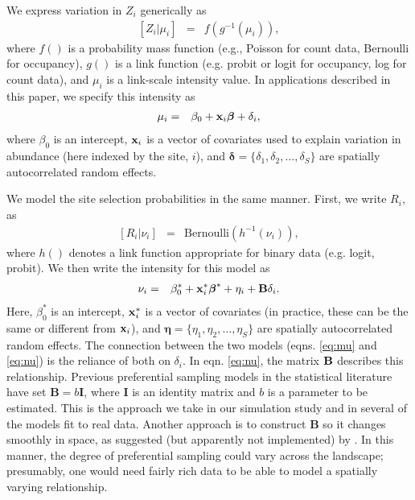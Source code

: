 \documentclass[times,mee,doublespace,]{besauth2}
\begin{document}
\begin{flushleft}
\hspace{0.5in} We express variation in $Z_i$ generically as
\begin{eqnarray}
  \label{eq:process}
  [Z_i|\mu_i] & = & f(g^{-1}(\mu_i)),
\end{eqnarray}
where $f()$ is a probability mass function (e.g., Poisson for count data, Bernoulli for occupancy), $g()$ is a link function (e.g. probit or logit for occupancy, log for count data), and $\mu_i$ is a link-scale intensity value.  In applications described in this paper, we specify this intensity as
\begin{eqnarray}
\mu_i & = & \beta_0 + {\bf x}_i \boldsymbol{\beta}+\delta_i,
 \label{eq:mu}
\end{eqnarray}
where $\beta_0$ is an intercept, ${\bf x}_i$ is a vector of covariates used to explain variation in abundance (here indexed by the site, $i$), and $\boldsymbol{\delta}=\{ \delta_1,\delta_2,\hdots,\delta_S \}$ are spatially autocorrelated random effects.

\hspace{0.5in} We model the site selection probabilities in the same manner.  First, we write $R_i$, as
\begin{eqnarray}
 \label{eq:R}
  [R_i|\nu_i] & = & \text{Bernoulli}(h^{-1}(\nu_i)),
\end{eqnarray}
where $h()$ denotes a link function appropriate for binary data (e.g. logit, probit).  We then write the intensity for this model as
\begin{eqnarray}
  \label{eq:nu}
  \nu_i & = & \beta_0^* + {\bf x}_i^* \boldsymbol{\beta}^*+\eta_i+{\bf B} \delta_i.
\label{eq:nu}
\end{eqnarray}
Here, $\beta_0^*$ is an intercept, ${\bf x}_i^*$ is a vector of covariates (in practice, these can be the same or different from ${\bf x}_i$), and $\boldsymbol{\eta}=\{ \eta_1,\eta_2,\hdots,\eta_S \}$ are spatially autocorrelated random effects.  The connection between the two models (eqns. \ref{eq:mu} and \ref{eq:nu}) is the reliance of both on $\delta_i$.  In eqn. \ref{eq:nu}, the matrix ${\bf B}$ describes this relationship.  Previous preferential sampling models in the statistical literature have set $\textbf{B} = b \textbf{I}$, where $\textbf{I}$ is an identity matrix and $b$ is a parameter to be estimated.  This is the approach we take in our simulation study and in several of the models fit to real data.  Another approach is to construct $\textbf{B}$ so it changes smoothly in space, as suggested (but apparently not implemented) by \citep{RoyleBerliner1999}.  In this manner, the degree of preferential sampling could vary across the landscape; presumably, one would need fairly rich data to be able to model a spatially varying relationship.


\end{flushleft}
\end{document}
